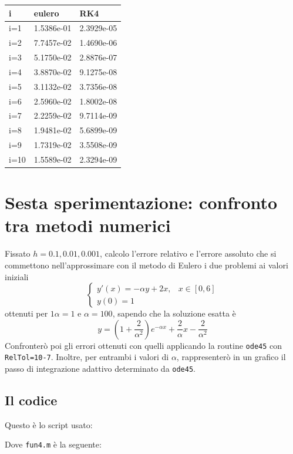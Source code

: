 \documentclass{article}
\begin{document}
	\begin{tabular}{|l|l|l|}
	\hline
	i & eulero & RK4 \\ \hline
	i=1 & 1.5386e-01 & 2.3929e-05 \\ \hline
	i=2 & 7.7457e-02 & 1.4690e-06 \\ \hline
	i=3 & 5.1750e-02 & 2.8876e-07 \\ \hline
	i=4 & 3.8870e-02 & 9.1275e-08 \\ \hline
	i=5 & 3.1132e-02 & 3.7356e-08 \\ \hline
	i=6 & 2.5960e-02 & 1.8002e-08 \\ \hline
	i=7 & 2.2259e-02 & 9.7114e-09 \\ \hline
	i=8 & 1.9481e-02 & 5.6899e-09 \\ \hline
	i=9 & 1.7319e-02 & 3.5508e-09 \\ \hline
	i=10 & 1.5589e-02 & 2.3294e-09 \\ \hline
	\end{tabular}

	\section{Sesta sperimentazione: confronto tra metodi numerici}
	Fissato $h = 0.1, 0.01, 0.001$, calcolo l’errore relativo e l’errore assoluto che si commettono nell’approssimare con il metodo di Eulero i due problemi ai valori iniziali
	\begin{equation}
	\begin{cases}
	y'(x)=-\alpha y +2x, & x \in\left[0, 6\right] \\
	y(0)=1
	\end{cases}
	\end{equation}
	ottenuti per $1\alpha= 1$ e $\alpha = 100$, sapendo che la soluzione esatta è
	$$y=\left(1+\frac{2}{\alpha^2}\right) e^{-\alpha x}+ \frac{2}{\alpha} x-\frac{2}{\alpha^2}$$
	Confronterò poi gli errori ottenuti con quelli applicando la routine {\tt ode45} con {\tt RelTol=10-7}. Inoltre, per entrambi i valori di $\alpha$, rappresenterò in un grafico il passo di integrazione adattivo determinato da {\tt ode45}.
	\subsection{Il codice}
	Questo è lo script usato:
	
	
	
	Dove {\tt fun4.m} è la seguente:
	
	
\end{document}

